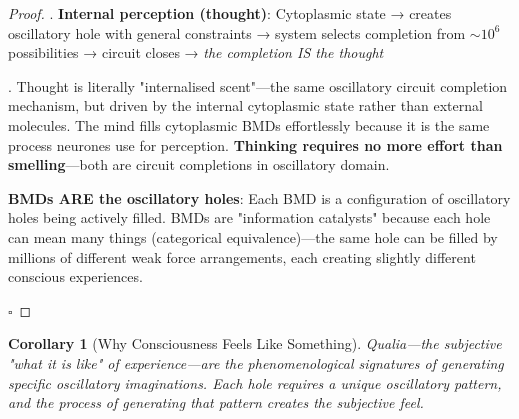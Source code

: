 \documentclass[11pt,a4paper]{article}
\newtheorem{corollary}[theorem]{Corollary}
\begin{document}
\begin{proof}
.  \textbf{Internal perception (thought)}: Cytoplasmic state → creates oscillatory hole with general constraints → system selects completion from $\sim 10^6$ possibilities → circuit closes → \textit{the completion IS the thought}

. Thought is literally "internalised scent"—the same oscillatory circuit completion mechanism, but driven by the internal cytoplasmic state rather than external molecules. The mind fills cytoplasmic BMDs effortlessly because it is the same process neurones use for perception. \textbf{Thinking requires no more effort than smelling}—both are circuit completions in oscillatory domain.

\textbf{BMDs ARE the oscillatory holes}: Each BMD is a configuration of oscillatory holes being actively filled. BMDs are "information catalysts" because each hole can mean many things (categorical equivalence)—the same hole can be filled by millions of different weak force arrangements, each creating slightly different conscious experiences.

$\square$
\end{proof}

\begin{corollary}[Why Consciousness Feels Like Something]
\label{cor:qualia}
Qualia—the subjective "what it is like" of experience—are the phenomenological signatures of generating specific oscillatory imaginations. Each hole requires a unique oscillatory pattern, and the \textit{process of generating that pattern} creates the subjective feel.
\end{corollary}
\end{document}
